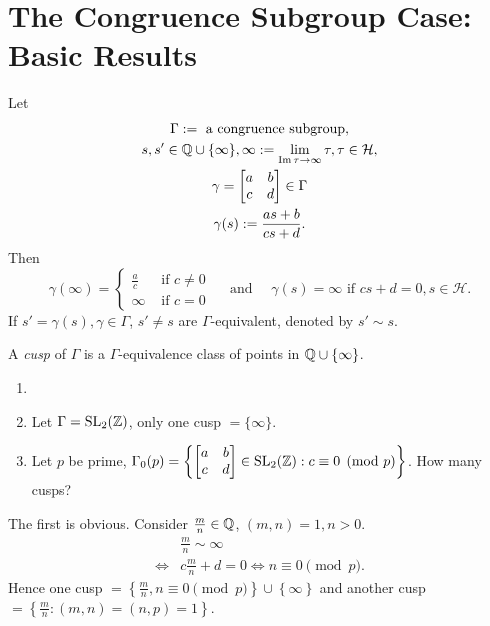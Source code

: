 \section{The Congruence Subgroup Case: Basic Results}
Let
\begin{gather*}
  \Gamma := \text{ a congruence subgroup},\\
  s,s'\in \mathbb{Q} \cup \{\infty\}, \infty := \lim_{\operatorname{Im} \tau\to \infty}\tau,\tau \in \mathcal{H},\\
  \gamma =  \begin{bmatrix} a&b\\c&d \end{bmatrix} \in \Gamma\\
 \gamma(s):= \frac{as+b}{cs+d}.
\end{gather*}
Then
\[
  \gamma(\infty)= \begin{cases}
    \frac{a}{c} & \text{ if }c\neq 0\\
    \infty & \text{ if }c=0
  \end{cases}\quad \text{ and }\quad \gamma(s)=\infty  \text{ if } cs+d=0,s \in \mathcal{H}.
\]
If $s'=\gamma(s),\gamma\in \Gamma$, $s'\neq s$ are $\Gamma$-equivalent, denoted by $s'\sim s$. 
 \begin{definition}
  A \textit{cusp} of $\Gamma$ is a $\Gamma$-equivalence class of points in $\mathbb{Q}\cup \{\infty\} $.
\end{definition}
\begin{exercise}
  \begin{enumerate}
    \item []
    \item Let $\Gamma=\operatorname{SL}_2(\mathbb{Z})$, only one cusp $=\{\infty\} $.
    \item Let $p$ be prime, $\Gamma_0(p)=\left\{\begin{bmatrix} a&b\\c&d \end{bmatrix} \in \operatorname{SL}_2(\mathbb{Z}):c\equiv 0 \pmod{p}\right\} $. How many cusps?
  \end{enumerate}
\end{exercise}
\begin{solution}
  The first is obvious. Consider $\frac{m}{n}\in \mathbb{Q}$, $(m,n)=1,n>0$.
  \begin{align*}
    &\frac{m}{n}\sim \infty\\
    \Leftrightarrow & c \frac{m}{n}+d=0\Leftrightarrow n\equiv 0 \pmod{p}
  .\end{align*}
  Hence one cusp $=\left\{ \frac{m}{n},n\equiv 0 \pmod{p} \right\} \cup \left\{ \infty \right\} $  and another cusp $=\left\{ \frac{m}{n}:(m,n)=(n,p)=1 \right\} $.
\end{solution}

